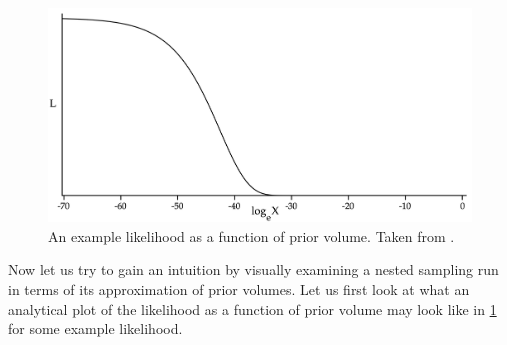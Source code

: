 \begin{figure} 
\centering    
\includegraphics[width=1.0\textwidth]{Chapter2/Figs/Raster/Screenshot 2022-11-08 at 06.29.01.png}
\caption{ An example likelihood as a function of prior volume. Taken from \cite{10.1214/06-BA127}.}
\label{fig:skil1}
\end{figure}

Now let us try to gain an intuition by visually examining a nested sampling run in terms of its approximation of prior volumes. Let us first look at what an analytical plot of the likelihood as a function of prior volume may look like in \cref{fig:skil1} for some example likelihood.

